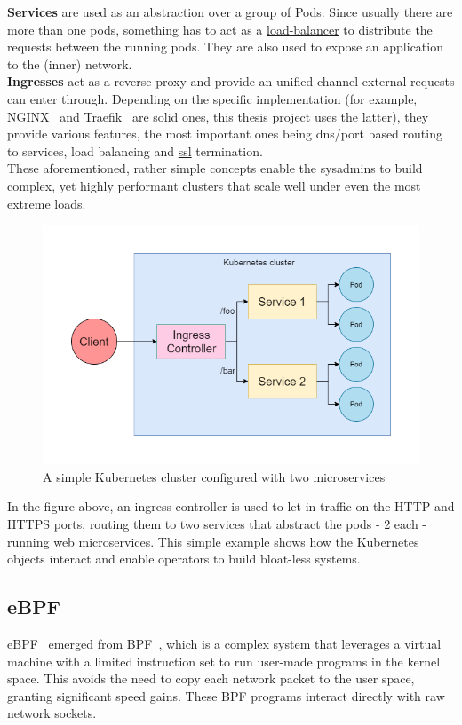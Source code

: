 \textbf{Services} are used as an abstraction over a group of Pods. Since usually there are more than one pods, something has to act as a \underline{\gls{load-balancer}} to distribute the requests between the running pods. They are also used to expose an application to the (inner) network. \\

\textbf{Ingresses} act as a reverse-proxy and provide an unified channel external requests can enter through. Depending on the specific implementation (for example, NGINX~\cite{nginx} and Traefik~\cite{traefik} are solid ones, this thesis project uses the latter), they provide various features, the most important ones being dns/port based routing to services, load balancing and \underline{\gls{ssl}} termination. \\

These aforementioned, rather simple concepts enable the sysadmins to build complex, yet highly performant clusters that scale well under even the most extreme loads.

\begin{figure}[H]
	\centering
	\includegraphics[width=\textwidth]{images/kube-arch2.png}
	\caption{A simple Kubernetes cluster configured with two microservices}
	\label{fig:kube-cluster}
\end{figure}

In the figure above, an ingress controller is used to let in traffic on the HTTP and HTTPS ports, routing them to two services that abstract the pods - 2 each - running web microservices. This simple example shows how the Kubernetes objects interact and enable operators to build bloat-less systems.

\newpage
\subsection{eBPF}
eBPF~\cite{ebpf} emerged from BPF~\cite{bpf-original}, which is a complex system that leverages a virtual machine with a limited instruction set to run user-made programs in the kernel space. This avoids the need to copy each network packet to the user space, granting significant speed gains. These BPF programs interact directly with raw network sockets. \\

